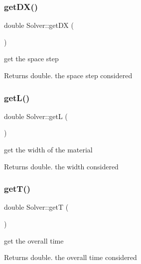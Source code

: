 \subsubsection{\texorpdfstring{get\+D\+X()}{getDX()}}
{\footnotesize\ttfamily double Solver\+::get\+DX (\begin{DoxyParamCaption}{ }\end{DoxyParamCaption})}

get the space step
\begin{DoxyItemize}
\item \begin{DoxyReturn}{Returns}
double. the space step considered 
\end{DoxyReturn}

\end{DoxyItemize}\mbox{\label{classSolver_afb4f245f8c8109afb3301942d30b4544}} 
\subsubsection{\texorpdfstring{get\+L()}{getL()}}
{\footnotesize\ttfamily double Solver\+::getL (\begin{DoxyParamCaption}{ }\end{DoxyParamCaption})}

get the width of the material
\begin{DoxyItemize}
\item \begin{DoxyReturn}{Returns}
double. the width considered 
\end{DoxyReturn}

\end{DoxyItemize}\mbox{\label{classSolver_a7a09182372f91099da1cba8b1527e4c7}} 
\subsubsection{\texorpdfstring{get\+T()}{getT()}}
{\footnotesize\ttfamily double Solver\+::getT (\begin{DoxyParamCaption}{ }\end{DoxyParamCaption})}

get the overall time
\begin{DoxyItemize}
\item \begin{DoxyReturn}{Returns}
double. the overall time considered 
\end{DoxyReturn}

\end{DoxyItemize}\mbox{\label{classSolver_ac091deb09ce1bb4bf2f70b6af3a2d6c2}} 
